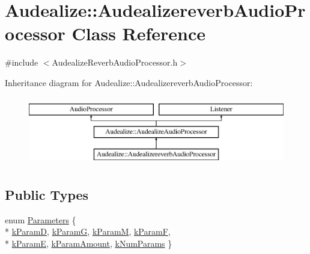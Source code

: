 \hypertarget{class_audealize_1_1_audealizereverb_audio_processor}{}\section{Audealize\+:\+:Audealizereverb\+Audio\+Processor Class Reference}
\label{class_audealize_1_1_audealizereverb_audio_processor}


{\ttfamily \#include $<$Audealize\+Reverb\+Audio\+Processor.\+h$>$}

Inheritance diagram for Audealize\+:\+:Audealizereverb\+Audio\+Processor\+:\begin{figure}[H]
\begin{center}
\leavevmode
\includegraphics[height=3.000000cm]{class_audealize_1_1_audealizereverb_audio_processor}
\end{center}
\end{figure}
\subsection*{Public Types}
\begin{DoxyCompactItemize}
\item 
enum \hyperlink{class_audealize_1_1_audealizereverb_audio_processor_a89e8659eef504fb10db0e64f9a0f551f}{Parameters} \{ \\*
\hyperlink{class_audealize_1_1_audealizereverb_audio_processor_a89e8659eef504fb10db0e64f9a0f551fab32a709c98309797cc74541db7c0e9a8}{k\+ParamD}, 
\hyperlink{class_audealize_1_1_audealizereverb_audio_processor_a89e8659eef504fb10db0e64f9a0f551fa0e4e0548802fd678b2a5554a73f3ad0b}{k\+ParamG}, 
\hyperlink{class_audealize_1_1_audealizereverb_audio_processor_a89e8659eef504fb10db0e64f9a0f551fa7d549f2640f3108cfbbd556a099a04c3}{k\+ParamM}, 
\hyperlink{class_audealize_1_1_audealizereverb_audio_processor_a89e8659eef504fb10db0e64f9a0f551fa7b684621273041ffe5630add316cda13}{k\+ParamF}, 
\\*
\hyperlink{class_audealize_1_1_audealizereverb_audio_processor_a89e8659eef504fb10db0e64f9a0f551fa40899a272bfa2c98843024801fca4d2a}{k\+ParamE}, 
\hyperlink{class_audealize_1_1_audealizereverb_audio_processor_a89e8659eef504fb10db0e64f9a0f551fac9acd4f2971053b24a99295f73be0fb2}{k\+Param\+Amount}, 
\hyperlink{class_audealize_1_1_audealizereverb_audio_processor_a89e8659eef504fb10db0e64f9a0f551fafa0a87245f3807917fddc2d3468ae409}{k\+Num\+Params}
 \}
\end{DoxyCompactItemize}

